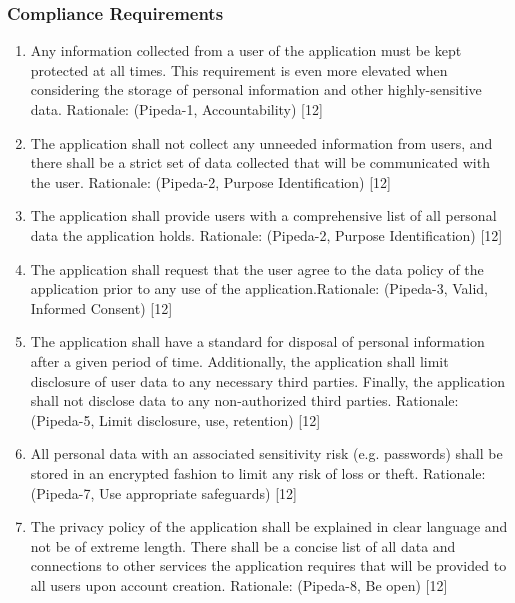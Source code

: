 \documentclass[]{article}
\begin{document}
\subsubsection{Compliance Requirements}
\label{ssub:compliance_requirements}
\begin{enumerate}[{LR-COMP}1. ]
	\item Any information collected from a user of the application must be kept protected at all times. This requirement is even more elevated when considering the storage of personal information and other highly-sensitive data. Rationale: (Pipeda-1, Accountability) [12]
	\item The application shall not collect any unneeded information from users, and there shall be a strict set of data collected that will be communicated with the user. Rationale: (Pipeda-2, Purpose Identification) [12]
	\item The application shall provide users with a comprehensive list of all personal data the application holds. Rationale: (Pipeda-2, Purpose Identification) [12]
	\item The application shall request that the user agree to the data policy of the application prior to any use of the application.Rationale: (Pipeda-3, Valid, Informed Consent) [12]
	\item The application shall have a standard for disposal of personal information after a given period of time. Additionally, the application shall limit disclosure of user data to any necessary third parties. Finally, the application shall not disclose data to any non-authorized third parties. Rationale: (Pipeda-5, Limit disclosure, use, retention) [12]
	\item All personal data with an associated sensitivity risk (e.g. passwords) shall be stored in an encrypted fashion to limit any risk of loss or theft. Rationale: (Pipeda-7, Use appropriate safeguards) [12]
	\item  The privacy policy of the application shall be explained in clear language and not be of extreme length. There shall be a concise list of all data and connections to other services the application requires that will be provided to all users upon account creation. Rationale: (Pipeda-8, Be open) [12]
\end{enumerate}
\end{document}
